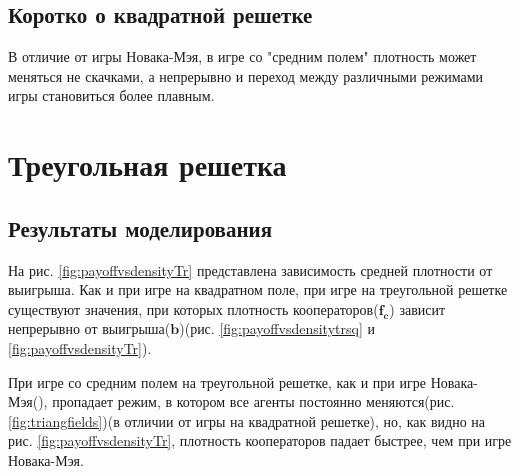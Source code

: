 \documentclass[12pt]{article}
\begin{document}
    \subsection{Коротко о квадратной решетке}
        В отличие от игры Новака-Мэя, в игре со "средним полем" плотность может меняться не скачками, а непрерывно и переход между различными режимами игры становиться более плавным.
    
\section{Треугольная решетка}
    \subsection{Результаты моделирования}
        На рис. \ref{fig:payoffvsdensityTr} представлена зависимость средней плотности от выигрыша. Как и при игре на квадратном поле, при игре на треугольной решетке существуют значения, при которых плотность кооператоров($\mathbf{f_c}$) зависит непрерывно от выигрыша($\mathbf{b}$)(рис. \ref{fig:payoffvsdensitytrsq} и \ref{fig:payoffvsdensityTr}).
            
        При игре со средним полем на треугольной решетке, как и при игре Новака-Мэя(\cite{KOLOTEV2018}), пропадает режим, в котором все агенты постоянно меняются(рис. \ref{fig:triangfields})(в отличии от игры на квадратной решетке), но, как видно на рис. \ref{fig:payoffvsdensityTr}, плотность кооператоров падает быстрее, чем при игре Новака-Мэя.
            
\end{document}
